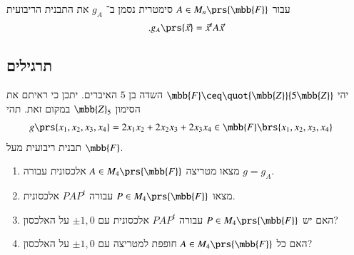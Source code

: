 \documentclass[a4paper,10pt,oneside,openany]{article}
\begin{document}
\begin{notation}
עבור
$A \in M_n\prs{\mbb{F}}$
סימטרית נסמן ב־%
$g_A$
את התבנית הריבועית
\[\text{.} g_A\prs{\vec{x}} = \vec{x}^t A \vec{x}\]
\end{notation}

\subsection{תרגילים}

\begin{exercise}
יהי
$\mbb{F} \ceq \quot{\mbb{Z}}{5\mbb{Z}}$
השדה בן
$5$
האיברים.
יתכן כי ראיתם את הסימון
$\mbb{Z}_5$
במקום זאת.
תהי
\begin{align*}
g\prs{x_1, x_2, x_3, x_4} &= 2 x_1 x_2 + 2 x_2 x_3 + 2 x_3 x_4 \in \mbb{F}\brs{x_1, x_2, x_3, x_4}
\end{align*}
תבנית ריבועית מעל
$\mbb{F}$.

\begin{enumerate}
\item מצאו מטריצה
$A \in M_4\prs{\mbb{F}}$
אלכסונית עבורה
$g = g_A$.

\item מצאו
$P \in M_4\prs{\mbb{F}}$
עבורה
$P A P^t$
אלכסונית.

\item האם יש
$P \in M_4\prs{\mbb{F}}$
עבורה
$P A P^t$
אלכסונית עם
$\pm 1, 0$
על האלכסון?

\item האם כל
$A \in M_4\prs{\mbb{F}}$
חופפת למטריצה עם
$\pm 1, 0$
על האלכסון?
\end{enumerate}
\end{exercise}
\end{document}
